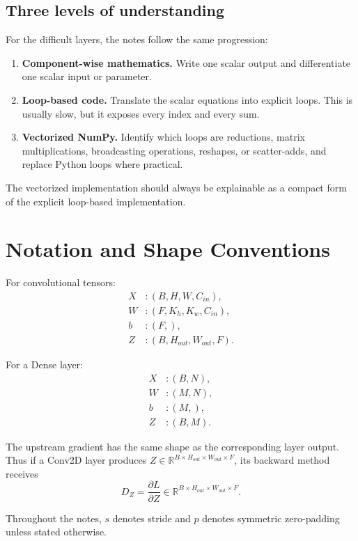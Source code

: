 \documentclass[11pt,a4paper]{article}
\newcommand{\pd}[2]{\frac{\partial #1}{\partial #2}}
\newcommand{\R}{\mathbb{R}}
\begin{document}
\subsection{Three levels of understanding}

For the difficult layers, the notes follow the same progression:
\begin{enumerate}[leftmargin=2em]
    \item \textbf{Component-wise mathematics.} Write one scalar output and differentiate one scalar input or parameter.
    \item \textbf{Loop-based code.} Translate the scalar equations into explicit loops. This is usually slow, but it exposes every index and every sum.
    \item \textbf{Vectorized NumPy.} Identify which loops are reductions, matrix multiplications, broadcasting operations, reshapes, or scatter-adds, and replace Python loops where practical.
\end{enumerate}

The vectorized implementation should always be explainable as a compact form of the explicit loop-based implementation.

\section{Notation and Shape Conventions}

For convolutional tensors:
\begin{align*}
X &: (B,H,W,C_{in}),\\
W &: (F,K_h,K_w,C_{in}),\\
b &: (F,),\\
Z &: (B,H_{out},W_{out},F).
\end{align*}

For a Dense layer:
\begin{align*}
X &: (B,N),\\
W &: (M,N),\\
b &: (M,),\\
Z &: (B,M).
\end{align*}

The upstream gradient has the same shape as the corresponding layer output. Thus if a Conv2D layer produces $Z\in\R^{B\times H_{out}\times W_{out}\times F}$, its backward method receives
\[
D_Z=\pd{L}{Z}\in\R^{B\times H_{out}\times W_{out}\times F}.
\]

Throughout the notes, $s$ denotes stride and $p$ denotes symmetric zero-padding unless stated otherwise.
\end{document}
